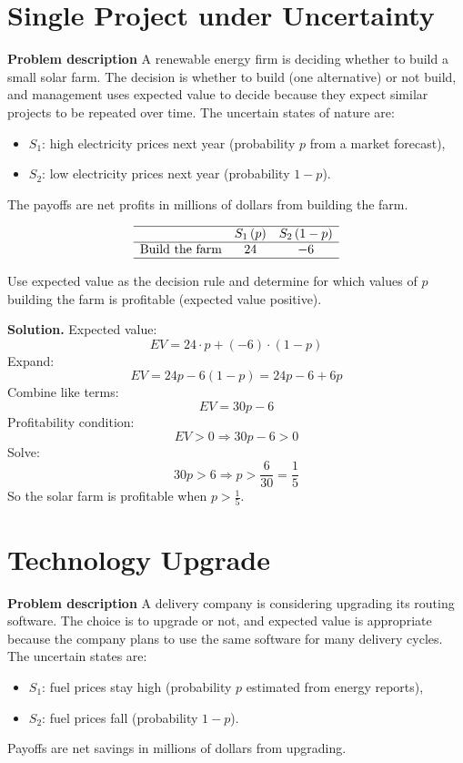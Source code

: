 	\begin{ExamProblems}
		
		\hypertarget{c7-ex1}{}
		\item
		\section{Single Project under Uncertainty}
		
		\textbf{Problem description}
		A renewable energy firm is deciding whether to build a small solar farm. The decision is whether to build (one alternative) or not build, and management uses expected value to decide because they expect similar projects to be repeated over time. The uncertain states of nature are:
		\begin{itemize}
			\item \(S_1\): high electricity prices next year (probability \(p\) from a market forecast),
			\item \(S_2\): low electricity prices next year (probability \(1-p\)).
		\end{itemize}
		The payoffs are net profits in millions of dollars from building the farm.
		
		\[
		\begin{array}{lcc}
			\hline
			& S_1\,(p) & S_2\,(1-p) \\
			\hline
			\text{Build the farm} & 24 & -6 \\
			\hline
		\end{array}
		\]
		
		Use expected value as the decision rule and determine for which values of \(p\) building the farm is profitable (expected value positive).
		
		\textbf{Solution.}
		Expected value:
		\[
		EV = 24\cdot p + (-6)\cdot(1-p)
		\]
		Expand:
		\[
		EV = 24p - 6(1-p) = 24p - 6 + 6p
		\]
		Combine like terms:
		\[
		EV = 30p - 6
		\]
		Profitability condition:
		\[
		EV>0 \Rightarrow 30p-6>0
		\]
		Solve:
		\[
		30p>6 \Rightarrow p>\frac{6}{30}=\frac{1}{5}
		\]
		So the solar farm is profitable when \(p>\frac{1}{5}\).
		
		
		\hypertarget{c7-ex2}{}
		\item
		\section{Technology Upgrade}
		
		\textbf{Problem description}
		A delivery company is considering upgrading its routing software. The choice is to upgrade or not, and expected value is appropriate because the company plans to use the same software for many delivery cycles. The uncertain states are:
		\begin{itemize}
			\item \(S_1\): fuel prices stay high (probability \(p\) estimated from energy reports),
			\item \(S_2\): fuel prices fall (probability \(1-p\)).
		\end{itemize}
		Payoffs are net savings in millions of dollars from upgrading.
		

\end{ExamProblems}

